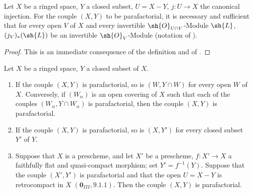 \begin{proposition}[21.13.5]
\label{IV.21.13.5}
Let $X$ be a ringed space, $Y$ a closed subset, $U=X-Y$, $j:U\to X$ the canonical injection.
For the couple $(X,Y)$ to be parafactorial, it is necessary and sufficient that for every open $V$ of $X$ and every invertible $\sh{O}_{U\cap V}$-Module $\sh{L}$, $(j_V)_*(\sh{L})$ be an invertible $\sh{O}_V$-Module (notation of ).
\end{proposition}

\begin{proof}
This is an immediate consequence of the definition  and of .
\end{proof}

\begin{corollary}[21.13.6]
\label{IV.21.13.6}
Let $X$ be a ringed space, $Y$ a closed subset of $X$.
\begin{enumerate}
  \item[(i)] If the couple $(X,Y)$ is parafactorial, so is $(W,Y\cap W)$ for every open $W$ of $X$.
  Conversely, if $(W_\alpha)$ is an open covering of $X$ such that each of the couples $(W_\alpha,Y\cap W_\alpha)$ is parafactorial, then the couple $(X,Y)$ is parafactorial.
  \item[(ii)] If the couple $(X,Y)$ is parafactorial, so is $(X,Y')$ for every closed subset $Y'$ of $Y$.
  \item[(iii)] Suppose that $X$ is a prescheme, and let $X'$ be a prescheme, $f:X'\to X$ a faithfully flat and quasi-compact morphism; set $Y'=f^{-1}(Y)$.
  Suppose that the couple $(X',Y')$ is parafactorial and that the open $U=X-Y$ is retrocompact in $X$ $(\mathbf{0}_{III}, 9.1.1)$.
  Then the couple $(X,Y)$ is parafactorial.
\end{enumerate}
\end{corollary}

